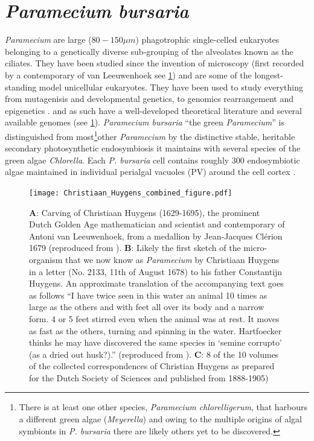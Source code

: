 \section{\textit{Paramecium bursaria}}
\textit{Paramecium} are large (\(80-150\mu m\)) phagotrophic single-celled eukaryotes belonging %
to a genetically diverse \citep{Prescott1994} sub-grouping of the alveolates known as the ciliates.
They have been studied since the invention of microscopy \citep{Gortz2009} (first recorded by a contemporary of van Leeuwenhoek 
see \ref{fig:huygens}) and are some of the longest-standing model unicellular eukaryotes.  They have been used
to study everything from mutagenisis and developmental genetics, to genomics rearrangement and epigenetics \citep{McGrath2014}. 
and as such have a well-developed theoretical literature and several available genomes (see \ref{}). %
\textit{Paramecium bursaria} ``the green \textit{Paramecium}'' is distinguished from most\footnote{
    There is at least one other species, \textit{Paramecium chlorelligerum}, that harbours a different green algae (\textit{Meyerella}) \citep{Kreutz2012}
    and owing to the multiple origins of algal symbionts in \textit{P. bursaria} \citep{Hoshina2009} there are likely others yet to be discovered.
}other \textit{Paramecium} by the distinctive stable, heritable secondary photosynthetic endosymbiosis it maintains with several species of the green algae \textit{Chlorella}.  
Each \textit{P. bursaria} cell contains roughly 300 endosymbiotic algae maintained in individual perialgal vacuoles (PV) around the cell
cortex \citep{Hoshina2009}.

\begin{figure}[h!]
    \caption{\textbf{A}: Carving of Christiaan Huygens (1629-1695), the prominent Dutch Golden Age mathematician and scientist and contemporary of Antoni van Leeuwenhoek, from a medallion by Jean-Jacques Cl\'erion 1679 (reproduced from \citep{Huygens}). \textbf{B}: Likely the first sketch of the micro-organism that we now know as \textit{Paramecium} by Christiaan Huygens in a letter (No. 2133, 11th of August 1678) to his father Constantijn Huygens. An approximate translation of the accompanying text goes as follows ``I have twice seen in this water an animal 10 times as large as the others and with feet all over its body and a narrow form. 4 or 5 feet stirred even when the animal was at rest. It moves as fast as the others, turning and spinning in the water. Hartfoecker thinks he may have discovered the same species in `semine corrupto' (as a dried out husk?).'' (reproduced from \citep{Huygens}). \textbf{C}: 8 of the 10 volumes of the collected correspondences of Christian Huygens as prepared for the Dutch Society of Sciences and published from 1888-1905)}
    \label{fig:huygens}
\texttt{[image: Christiaan\_Huygens\_combined\_figure.pdf]}
\end{figure}

